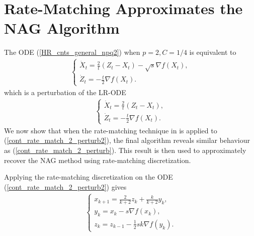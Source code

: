 \documentclass{article}
\theoremstyle{plain}
\theoremstyle{definition}
\theoremstyle{remark}
\begin{document}
\section{Rate-Matching Approximates the NAG  Algorithm}\label{section4}
The ODE (\ref{HR_cnts_general_npq2}) when \(p=2,C=1/4\) is equivalent to
\begin{align}\label{cont_rate_match_2_perturb}
    \left\{\begin{array}{l}
         \dot X_t = \frac{2}{t}(Z_t-X_t)-\sqrt{s}\nabla f(X_t),  \\
          \dot Z_t = -\frac{t}{2}\nabla f(X_t).
    \end{array}
    \right.
\end{align}
which is a perturbation of the LR-ODE
\begin{align}\label{cont_rate_match_2_perturb2}
    \left\{\begin{array}{l}
         \dot X_t = \frac{2}{t}(Z_t-X_t),  \\
          \dot Z_t = -\frac{t}{2}\nabla f(X_t).
    \end{array}
    \right.
\end{align}
We now show that when the rate-matching technique in \citep{WibisonoE7351} is applied to (\ref{cont_rate_match_2_perturb2}), the final algorithm reveals similar behaviour as (\ref{cont_rate_match_2_perturb}). This result is then used to approximately recover the NAG method using rate-matching discretization. \par
  Applying the rate-matching discretization on the ODE (\ref{cont_rate_match_2_perturb2}) gives
\begin{align}\label{rate_match_2}
    \left\{\begin{array}{l}
    x_{k+1}=\frac{2}{k+2}z_k+\frac{k}{k+2}y_k,\\
    y_{k}=x_k-s\nabla f(x_k),   \\
    z_{k}=z_{k-1} -\tfrac{1}{2}s k\nabla f(y_k)  .    
    \end{array}\right.
\end{align}
\end{document}
